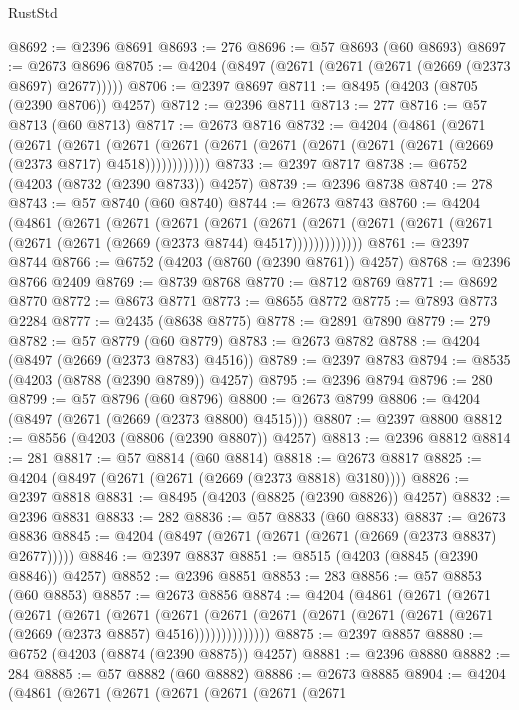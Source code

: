 \begin{lexlean}{RustStd}
\begin{coremodule}
@8692 := @2396 @8691
@8693 := 276
@8696 := @57 @8693 (@60 @8693)
@8697 := @2673 @8696
@8705 := @4204 (@8497 (@2671 (@2671 (@2671 (@2669 (@2373 @8697) @2677)))))
@8706 := @2397 @8697
@8711 := @8495 (@4203 (@8705 (@2390 @8706)) @4257)
@8712 := @2396 @8711
@8713 := 277
@8716 := @57 @8713 (@60 @8713)
@8717 := @2673 @8716
@8732 := @4204
    (@4861
      (@2671
        (@2671
          (@2671
            (@2671 (@2671 (@2671 (@2671 (@2671 (@2671 (@2671 (@2669 (@2373 @8717) @4518))))))))))))
@8733 := @2397 @8717
@8738 := @6752 (@4203 (@8732 (@2390 @8733)) @4257)
@8739 := @2396 @8738
@8740 := 278
@8743 := @57 @8740 (@60 @8740)
@8744 := @2673 @8743
@8760 := @4204
    (@4861
      (@2671
        (@2671
          (@2671
            (@2671
              (@2671
                (@2671 (@2671 (@2671 (@2671 (@2671 (@2671 (@2669 (@2373 @8744) @4517)))))))))))))
@8761 := @2397 @8744
@8766 := @6752 (@4203 (@8760 (@2390 @8761)) @4257)
@8768 := @2396 @8766 @2409
@8769 := @8739 @8768
@8770 := @8712 @8769
@8771 := @8692 @8770
@8772 := @8673 @8771
@8773 := @8655 @8772
@8775 := @7893 @8773 @2284
@8777 := @2435 (@8638 @8775)
@8778 := @2891 @7890
@8779 := 279
@8782 := @57 @8779 (@60 @8779)
@8783 := @2673 @8782
@8788 := @4204 (@8497 (@2669 (@2373 @8783) @4516))
@8789 := @2397 @8783
@8794 := @8535 (@4203 (@8788 (@2390 @8789)) @4257)
@8795 := @2396 @8794
@8796 := 280
@8799 := @57 @8796 (@60 @8796)
@8800 := @2673 @8799
@8806 := @4204 (@8497 (@2671 (@2669 (@2373 @8800) @4515)))
@8807 := @2397 @8800
@8812 := @8556 (@4203 (@8806 (@2390 @8807)) @4257)
@8813 := @2396 @8812
@8814 := 281
@8817 := @57 @8814 (@60 @8814)
@8818 := @2673 @8817
@8825 := @4204 (@8497 (@2671 (@2671 (@2669 (@2373 @8818) @3180))))
@8826 := @2397 @8818
@8831 := @8495 (@4203 (@8825 (@2390 @8826)) @4257)
@8832 := @2396 @8831
@8833 := 282
@8836 := @57 @8833 (@60 @8833)
@8837 := @2673 @8836
@8845 := @4204 (@8497 (@2671 (@2671 (@2671 (@2669 (@2373 @8837) @2677)))))
@8846 := @2397 @8837
@8851 := @8515 (@4203 (@8845 (@2390 @8846)) @4257)
@8852 := @2396 @8851
@8853 := 283
@8856 := @57 @8853 (@60 @8853)
@8857 := @2673 @8856
@8874 := @4204
    (@4861
      (@2671
        (@2671
          (@2671
            (@2671
              (@2671
                (@2671
                  (@2671 (@2671 (@2671 (@2671 (@2671 (@2671 (@2669 (@2373 @8857) @4516))))))))))))))
@8875 := @2397 @8857
@8880 := @6752 (@4203 (@8874 (@2390 @8875)) @4257)
@8881 := @2396 @8880
@8882 := 284
@8885 := @57 @8882 (@60 @8882)
@8886 := @2673 @8885
@8904 := @4204
    (@4861
      (@2671
        (@2671
          (@2671
            (@2671
              (@2671
                (@2671

\end{coremodule}
\end{lexlean}
